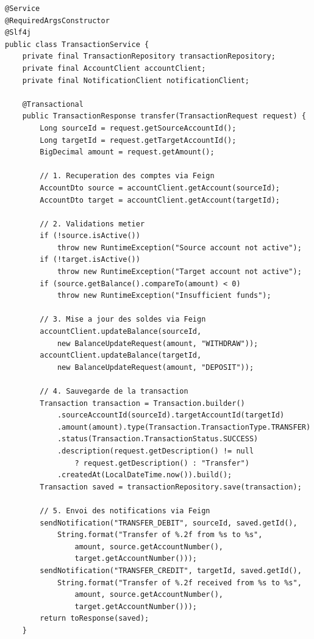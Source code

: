 \documentclass[12pt,a4paper]{article}
\begin{document}
\begin{lstlisting}[style=javastyle, caption={TransactionService.java --- Logique du virement (extrait)}, label=lst:txnsvc]
@Service
@RequiredArgsConstructor
@Slf4j
public class TransactionService {
    private final TransactionRepository transactionRepository;
    private final AccountClient accountClient;
    private final NotificationClient notificationClient;

    @Transactional
    public TransactionResponse transfer(TransactionRequest request) {
        Long sourceId = request.getSourceAccountId();
        Long targetId = request.getTargetAccountId();
        BigDecimal amount = request.getAmount();

        // 1. Recuperation des comptes via Feign
        AccountDto source = accountClient.getAccount(sourceId);
        AccountDto target = accountClient.getAccount(targetId);

        // 2. Validations metier
        if (!source.isActive())
            throw new RuntimeException("Source account not active");
        if (!target.isActive())
            throw new RuntimeException("Target account not active");
        if (source.getBalance().compareTo(amount) < 0)
            throw new RuntimeException("Insufficient funds");

        // 3. Mise a jour des soldes via Feign
        accountClient.updateBalance(sourceId,
            new BalanceUpdateRequest(amount, "WITHDRAW"));
        accountClient.updateBalance(targetId,
            new BalanceUpdateRequest(amount, "DEPOSIT"));

        // 4. Sauvegarde de la transaction
        Transaction transaction = Transaction.builder()
            .sourceAccountId(sourceId).targetAccountId(targetId)
            .amount(amount).type(Transaction.TransactionType.TRANSFER)
            .status(Transaction.TransactionStatus.SUCCESS)
            .description(request.getDescription() != null
                ? request.getDescription() : "Transfer")
            .createdAt(LocalDateTime.now()).build();
        Transaction saved = transactionRepository.save(transaction);

        // 5. Envoi des notifications via Feign
        sendNotification("TRANSFER_DEBIT", sourceId, saved.getId(),
            String.format("Transfer of %.2f from %s to %s",
                amount, source.getAccountNumber(),
                target.getAccountNumber()));
        sendNotification("TRANSFER_CREDIT", targetId, saved.getId(),
            String.format("Transfer of %.2f received from %s to %s",
                amount, source.getAccountNumber(),
                target.getAccountNumber()));
        return toResponse(saved);
    }


\end{lstlisting}
\end{document}
